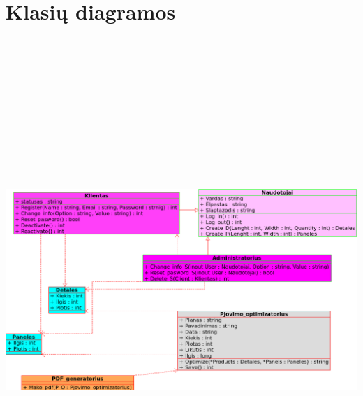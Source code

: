 \documentclass[a4paper,12pt]{article}
\begin{document}
\section{Klasių diagramos}
\begin{frame}

\centering
\hspace{-2cm}
\includegraphics[width=19cm, height=19cm]{class_diagram.png}
\end{frame}


\clearpage
\end{document}
